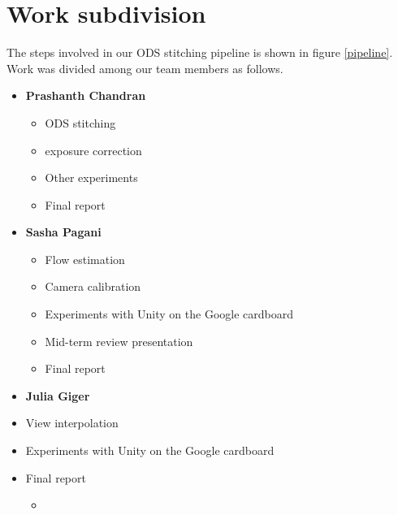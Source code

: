 \documentclass[10pt,twocolumn,letterpaper]{article}
\begin{document}
\section{Work subdivision}
\label{work-division}
The steps involved in our ODS stitching pipeline is shown in figure \ref{pipeline}. Work was divided among our team members as follows. 
\begin{itemize}
\item \textbf{Prashanth Chandran}
\begin{itemize}
\item ODS stitching
\item exposure correction
\item Other experiments
\item Final report
\end{itemize}
\item \textbf{Sasha Pagani}
\begin{itemize}
\item Flow estimation
\item Camera calibration
\item Experiments with Unity on the Google cardboard
\item Mid-term review presentation
\item Final report
\end{itemize}
\item \textbf{Julia Giger}
\item View interpolation
\item Experiments with Unity on the Google cardboard
\item Final report
\begin{itemize}
\item 
\end{itemize}
\end{itemize}

\end{document}
